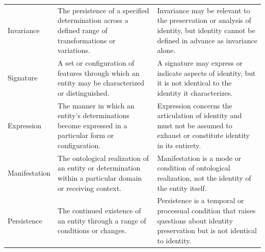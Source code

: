 \begin{table}[htbp]
\begin{tabular}{p{3.2cm} p{5.2cm} p{5.2cm}}
        Invariance &
        The persistence of a specified determination across a defined range of transformations or variations. &
        Invariance may be relevant to the preservation or analysis of identity, but identity cannot be defined in advance as invariance alone. \\

        Signature &
        A set or configuration of features through which an entity may be characterized or distinguished. &
        A signature may express or indicate aspects of identity, but it is not identical to the identity it characterizes. \\

        Expression &
        The manner in which an entity's determinations become expressed in a particular form or configuration. &
        Expression concerns the articulation of identity and must not be assumed to exhaust or constitute identity in its entirety. \\

        Manifestation &
        The ontological realization of an entity or determination within a particular domain or receiving context. &
        Manifestation is a mode or condition of ontological realization, not the identity of the entity itself. \\

        Persistence &
        The continued existence of an entity through a range of conditions or changes. &
        Persistence is a temporal or processual condition that raises questions about identity preservation but is not identical to identity. \\

        \hline
    \end{tabular}
\end{table}
